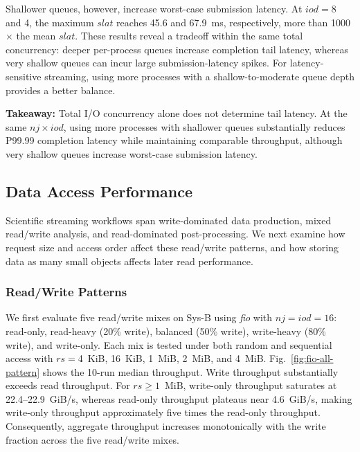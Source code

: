Shallower queues, however, increase worst-case submission latency. At $iod{=}8$ and 4, the maximum $slat$ reaches 45.6 and 67.9~ms, respectively, more than 1000$\times$ the mean $slat$. These results reveal a tradeoff within the same total concurrency: deeper per-process queues increase completion tail latency, whereas very shallow queues can incur large submission-latency spikes. For latency-sensitive streaming, using more processes with a shallow-to-moderate queue depth provides a better balance.

\begin{takeaway}
\textbf{Takeaway:} Total I/O concurrency alone does not determine tail latency. At the same $nj\times iod$, using more processes with shallower queues substantially reduces P99.99 completion latency while maintaining comparable throughput, although very shallow queues increase worst-case submission latency.
\end{takeaway}









\subsection{Data Access Performance}
\label{sec:rq3_us}

Scientific streaming workflows span write-dominated data production, mixed read/write analysis, and read-dominated post-processing. We next examine how request size and access order affect these read/write patterns, and how storing data as many small objects affects later read performance.

\subsubsection{Read/Write Patterns}

We first evaluate five read/write mixes on Sys-B using \textit{fio} with $nj{=}iod{=}16$: read-only, read-heavy (20\% write), balanced (50\% write), write-heavy (80\% write), and write-only. Each mix is tested under both random and sequential access with $rs{=}$4~KiB, 16~KiB, 1~MiB, 2~MiB, and 4~MiB. Fig.~\ref{fig:fio-all-pattern} shows the 10-run median throughput. Write throughput substantially exceeds read throughput. For $rs{\geq}1$~MiB, write-only throughput saturates at 22.4--22.9~GiB/s, whereas read-only throughput plateaus near 4.6~GiB/s, making write-only throughput approximately five times the read-only throughput. Consequently, aggregate throughput increases monotonically with the write fraction across the five read/write mixes.

